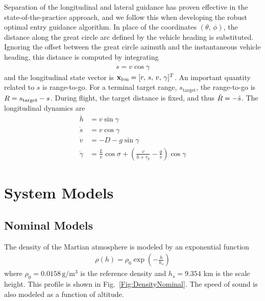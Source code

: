 Separation of the longitudinal and lateral guidance has proven effective in the state-of-the-practice approach, and we follow this when developing the robust optimal entry guidance algorithm. In place of the coordinates $(\theta,\,\phi)$, the distance along the great circle arc defined by the vehicle heading is substituted. Ignoring the offset between the great circle azimuth and the instantaneous vehicle heading, this distance is computed by integrating
\begin{align}
	\dot{s} = v\cos\gamma
\end{align}
and the longitudinal state vector is $\mathbf{x}_{\mathrm{lon}} = [r,\,s,\,v,\,\gamma]^T$. An important quantity related to $s$ is range-to-go. For a terminal target range, $s_{\mathrm{target}}$, the range-to-go is $R=s_{\mathrm{target}}-s$. During flight, the target distance is fixed, and thus $\dot{R}=-\dot{s}$.
The longitudinal dynamics are 
\begin{align}
	\dot{h} &= v\sin\gamma \label{Eq:dynamics:altitude:time}\\
	\dot{s} &= v\cos\gamma \\
	\dot{v} &= -D - g\sin\gamma \label{Eq:dynamics_velocity:time}\\ 
	\dot{\gamma} &= \frac{L}{v}\cos\sigma + \left(\frac{v}{h+r_p}-\frac{g}{v}\right)\cos\gamma \label{Eq:dynamics:fpa:time}
\end{align}

\section{System Models}
\subsection{Nominal Models}
The density of the Martian atmosphere is modeled by an exponential function
\begin{align}
	\rho(h) = \rho_0\exp(-\frac{h}{h_s}) \label{Eq:Density}
\end{align}
where $\rho_0=0.0158\,\mathrm{g}/\mathrm{m}^3$ is the reference density and $h_s=9.354$ km is the scale height. This profile is shown in Fig.~\ref{Fig:DensityNominal}. The speed of sound is also modeled as a function of altitude. 

